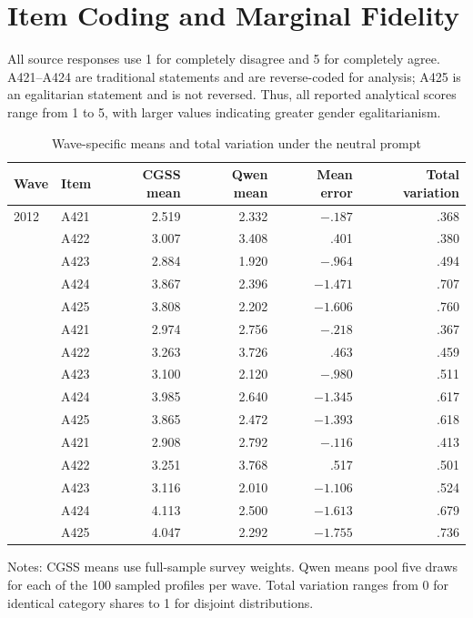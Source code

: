 \documentclass[11pt]{article}
\begin{document}
\section{Item Coding and Marginal Fidelity}

All source responses use 1 for completely disagree and 5 for completely agree. A421--A424 are
traditional statements and are reverse-coded for analysis; A425 is an egalitarian statement and is
not reversed. Thus, all reported analytical scores range from 1 to 5, with larger values indicating
greater gender egalitarianism.

\begin{table}[!htbp]
\centering
\caption{Wave-specific means and total variation under the neutral prompt}
\label{tab:s1-means}
\begin{threeparttable}
\small
\begin{tabular}{llrrrr}
\toprule
Wave & Item & CGSS mean & Qwen mean & Mean error & Total variation \\
\midrule
2012 & A421 & 2.519 & 2.332 & $-.187$ & .368 \\
     & A422 & 3.007 & 3.408 &  .401 & .380 \\
     & A423 & 2.884 & 1.920 & $-.964$ & .494 \\
     & A424 & 3.867 & 2.396 & $-1.471$ & .707 \\
     & A425 & 3.808 & 2.202 & $-1.606$ & .760 \\
\addlinespace
2018 & A421 & 2.974 & 2.756 & $-.218$ & .367 \\
     & A422 & 3.263 & 3.726 &  .463 & .459 \\
     & A423 & 3.100 & 2.120 & $-.980$ & .511 \\
     & A424 & 3.985 & 2.640 & $-1.345$ & .617 \\
     & A425 & 3.865 & 2.472 & $-1.393$ & .618 \\
\addlinespace
2021 & A421 & 2.908 & 2.792 & $-.116$ & .413 \\
     & A422 & 3.251 & 3.768 &  .517 & .501 \\
     & A423 & 3.116 & 2.010 & $-1.106$ & .524 \\
     & A424 & 4.113 & 2.500 & $-1.613$ & .679 \\
     & A425 & 4.047 & 2.292 & $-1.755$ & .736 \\
\bottomrule
\end{tabular}
\begin{tablenotes}[flushleft]
\footnotesize
\item Notes: CGSS means use full-sample survey weights. Qwen means pool five draws for each of the
100 sampled profiles per wave. Total variation ranges from 0 for identical category shares to 1 for
disjoint distributions.
\end{tablenotes}
\end{threeparttable}
\end{table}
\end{document}
